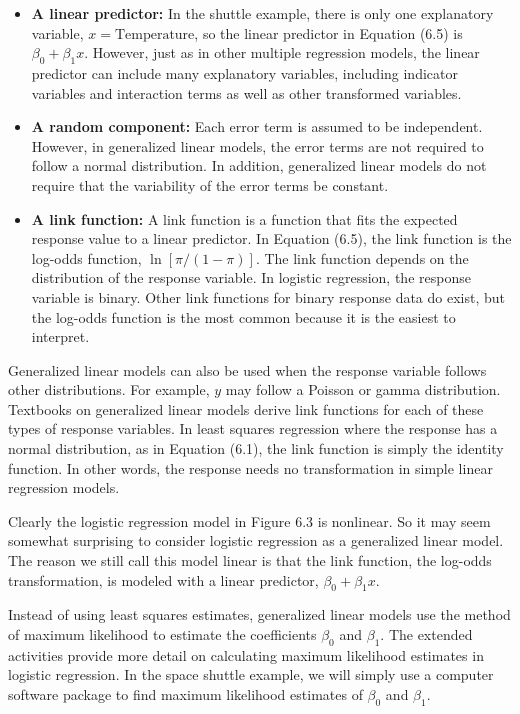 \documentclass[
]{book}
\begin{document}
\begin{itemize}
  \item \textbf{A linear predictor:} In the shuttle example, there is only one explanatory variable, $x = \text{Temperature}$, so the linear predictor in Equation (6.5) is $\beta_0 + \beta_1 x$. However, just as in other multiple regression models, the linear predictor can include many explanatory variables, including indicator variables and interaction terms as well as other transformed variables.
  \item \textbf{A random component:} Each error term is assumed to be independent. However, in generalized linear models, the error terms are not required to follow a normal distribution. In addition, generalized linear models do not require that the variability of the error terms be constant.
  \item \textbf{A link function:} A link function is a function that fits the expected response value to a linear predictor. In Equation (6.5), the link function is the log-odds function, $\ln[\pi/(1 - \pi)]$. The link function depends on the distribution of the response variable. In logistic regression, the response variable is binary. Other link functions for binary response data do exist, but the log-odds function is the most common because it is the easiest to interpret.
\end{itemize}

Generalized linear models can also be used when the response variable follows other distributions. For example, \(y\) may follow a Poisson or gamma distribution. Textbooks on generalized linear models derive link functions for each of these types of response variables. In least squares regression where the response has a normal distribution, as in Equation (6.1), the link function is simply the identity function. In other words, the response needs no transformation in simple linear regression models.

Clearly the logistic regression model in Figure 6.3 is nonlinear. So it may seem somewhat surprising to consider logistic regression as a generalized linear model. The reason we still call this model linear is that the link function, the log-odds transformation, is modeled with a linear predictor, \(\beta_0 + \beta_1 x\).

Instead of using least squares estimates, generalized linear models use the method of maximum likelihood to estimate the coefficients \(\beta_0\) and \(\beta_1\). The extended activities provide more detail on calculating maximum likelihood estimates in logistic regression. In the space shuttle example, we will simply use a computer software package to find maximum likelihood estimates of \(\beta_0\) and \(\beta_1\).
\end{document}
